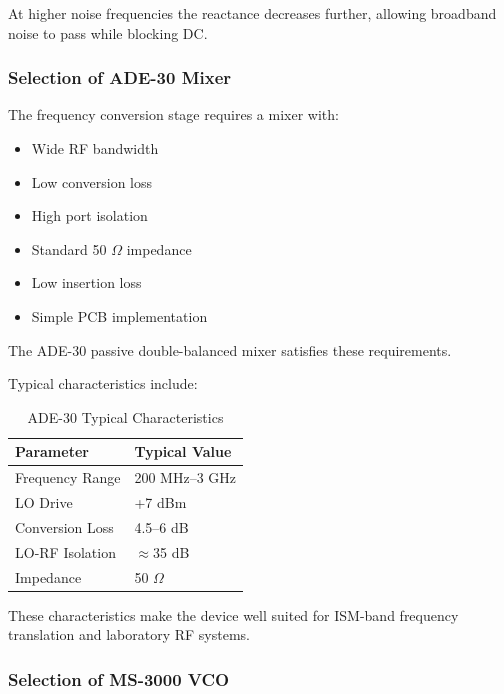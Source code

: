 \documentclass[12pt,a4paper]{report}
\begin{document}
	At higher noise frequencies the reactance decreases further, allowing broadband noise to pass while blocking DC.
	
	\subsubsection{Selection of ADE-30 Mixer}
	
	The frequency conversion stage requires a mixer with:
	\begin{itemize}
		\item Wide RF bandwidth
		\item Low conversion loss
		\item High port isolation
		\item Standard 50 $\Omega$ impedance
		\item Low insertion loss
		\item Simple PCB implementation
	\end{itemize}
	The ADE-30 passive double-balanced mixer satisfies these requirements.
	
	Typical characteristics include:
	
	\begin{table}[htbp]
		\centering
		\begin{tabular}{p{5cm} p{5cm}}
			\toprule
			\textbf{Parameter} & \textbf{Typical Value} \\
			\midrule
			Frequency Range & 200 MHz--3 GHz \\
			LO Drive & +7 dBm \\
			Conversion Loss & 4.5--6 dB \\
			LO-RF Isolation & $\approx$35 dB \\
			Impedance & 50 $\Omega$ \\
			\bottomrule
		\end{tabular}
		\caption{ADE-30 Typical Characteristics}
		\label{tab:ade30}
	\end{table}
	
	These characteristics make the device well suited for ISM-band frequency translation and laboratory RF systems.
	
	\subsubsection{Selection of MS-3000 VCO}
	
\end{document}
